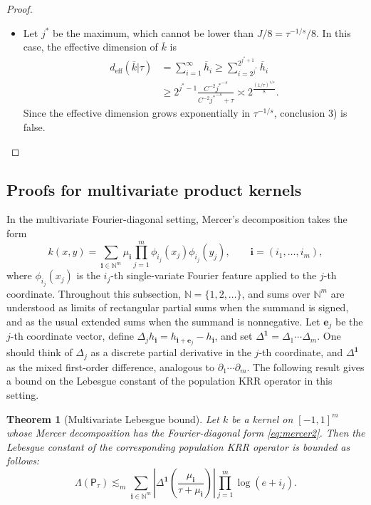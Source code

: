 \documentclass{article}
\newtheorem{theorem}{Theorem}
\numberwithin{theorem}{section}
\theoremstyle{definition}
\begin{document}
\begin{proof}
\begin{itemize}
        This contradicts item $2)$ in the statement of \cref{thm:lowerbound} for every $s'>s$.
        \item [(B)] Let $j^*$ be the maximum, which cannot be lower than $J/8=\tau^{-1/s}/8$.
        In this case, the effective dimension of $\overline k$ is
        \begin{align*}
            d_\text{eff}(\overline k|\tau) & =\sum_{i=1}^\infty \overline h_i\ge \sum_{i=2^{j^*}}^{2^{j^*+1}} \overline h_i\\ &\ge 2^{j^*-1}\frac{C^{-2}{j^*}^{-s}}{C^{-2}{j^*}^{-s}+\tau}
            \asymp 2^{\frac{(1/\tau)^{1/s}}{8}}.
        \end{align*}
        Since the effective dimension grows exponentially in $\tau^{-1/s}$, conclusion 3) is false.
    \end{itemize}
\end{proof}

\subsection{Proofs for multivariate product kernels}
\label{sec:proofs_multim}
In the multivariate Fourier-diagonal setting, Mercer's decomposition takes the form
\begin{equation}
    k(x,y)=\sum_{\bm i\in \mathbb N^m} \mu_{\bm i}\prod_{j=1}^m \phi_{i_j}(x_j)\phi_{i_j}(y_j),
    \qquad \bm i=(i_1,\dots,i_m),
    \label{eq:mercer2}
\end{equation}
where $\phi_{i_j}(x_j)$ is the $i_j$-th single-variate Fourier feature applied to the $j$-th coordinate. Throughout this subsection, $\mathbb N=\{1,2,\dots\}$, and sums over $\mathbb N^m$ are understood as limits of rectangular partial sums when the summand is signed, and as the usual extended sums when the summand is nonnegative.
Let $\bm e_j$ be the $j$-th coordinate vector, define $\Delta_jh_{\bm i}=h_{\bm i+\bm e_j}-h_{\bm i}$, and set $\Delta^{\bm 1}=\Delta_1\cdots\Delta_m$.
One should think of $\Delta_j$ as a discrete partial derivative in the $j$-th coordinate, and $\Delta^{\bm 1}$ as the mixed first-order difference, analogous to $\partial_1\cdots\partial_m$. The following result gives a bound on the Lebesgue constant of the population KRR operator in this setting.

\begin{theorem}[Multivariate Lebesgue bound]\label{thm:lebkermulti}
    Let $k$ be a kernel on $[-1,1]^m$ whose Mercer decomposition has the Fourier-diagonal form \eqref{eq:mercer2}. Then the Lebesgue constant of the corresponding population KRR operator is bounded as follows:
    $$\Lambda(\mathsf{P}_{\tau})\lesssim_m\sum_{\bm i\in \mathbb N^m} \left|\Delta^{\bm 1}\left(\frac{\mu_{\bm i}}{\tau+\mu_{\bm i}}\right)\right|\prod_{j=1}^m\log(e+i_j).$$
\end{theorem}
\end{document}
